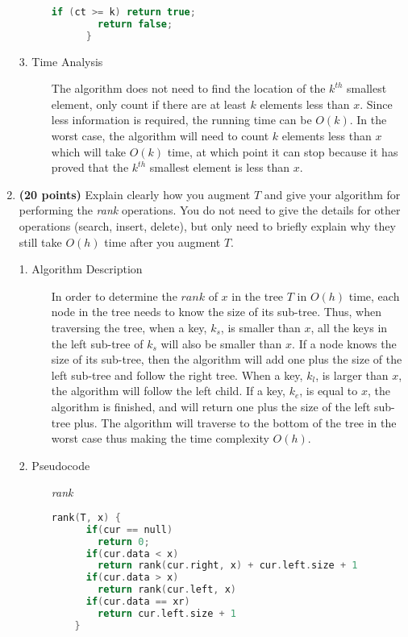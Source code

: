 \documentclass[11pt]{article}
\begin{document}
\begin{enumerate}
\begin{description}
\begin{lstlisting}[language=C++]
        if (ct >= k) return true;
        return false;
      }
    \end{lstlisting}

  \item[3. Time Analysis]
    The algorithm does not need to find the location of the $k^{th}$ smallest element, only count if there are at least $k$ elements less than $x$. Since less information is required, the running time can be $O(k)$. In the worst case, the algorithm will need to count $k$ elements less than $x$ which will take $O(k)$ time, at which point it can stop because it has proved that the $k^{th}$ smallest element is less than $x$.

\end{description}


\item %
{\bf (20 points)}
Explain clearly how you augment $T$ and give your algorithm for performing the {\em rank} operations. You do not need to give the details for other operations (search, insert, delete), but only need to briefly explain why they still take $O(h)$ time after you augment $T$.

\begin{description}
  \item[1. Algorithm Description]

  In order to determine the $rank$ of $x$ in the tree $T$ in $O(h)$ time, each node in the tree needs to know the size of its sub-tree. Thus, when traversing the tree, when a key, $k_s$, is smaller than $x$, all the keys in the left sub-tree of $k_s$ will also be smaller than $x$. If a node knows the size of its sub-tree, then the algorithm will add one plus the size of the left sub-tree and follow the right tree. When a key, $k_l$, is larger than $x$, the algorithm will follow the left child. If a key, $k_e$, is equal to $x$, the algorithm is finished, and will return one plus the size of the left sub-tree plus. The algorithm will traverse to the bottom of the tree in the worst case thus making the time complexity $O(h)$.

  \item[2. Pseudocode]
    \textit{rank}
    \begin{lstlisting}[language=C++]
    rank(T, x) {
      if(cur == null)
        return 0;
      if(cur.data < x)
        return rank(cur.right, x) + cur.left.size + 1
      if(cur.data > x)
        return rank(cur.left, x)
      if(cur.data == xr)
        return cur.left.size + 1
    }
    \end{lstlisting}


\end{description}
\end{enumerate}
\end{document}

